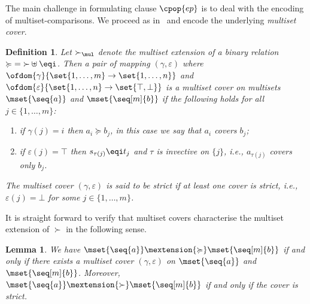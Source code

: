 \documentclass{LMCS}
\newtheorem{definition}[thm]{Definition}
\newtheorem{lemma}[thm]{Lemma}
\begin{document}
The main challenge in formulating clause $\cpop{ep}$
is to deal with the encoding of multiset-comparisons. 
We proceed as in~\cite{SK07} and encode the underlying \emph{multiset cover}.
\begin{definition}
Let $\succ_\mul$ denote the multiset extension of a binary relation ${\succcurlyeq} = {\succ} \uplus {\eqi}$.
Then a pair of mapping $(\gamma, \varepsilon)$ 
where $\ofdom{\gamma}{\set{1,\dots,m} \to \set{1,\dots,n}}$ 
and $\ofdom{\varepsilon}{\set{1,\dots,n} \to \set{\top,\bot}}$
is a multiset cover on multisets $\mset{\seq{a}}$ and $\mset{\seq[m]{b}}$
if the following holds for all $j \in \{1,\dots,m\}$:
\begin{enumerate}[labelsep=*,leftmargin=*]\label{d:mscover}
\item\label{d:mscover:1} if $\gamma(j) = i$ then $a_i \succcurlyeq b_j$, in this case we say that $a_i$ \emph{covers} $b_j$; 
\item\label{d:mscover:2} if $\varepsilon(j) = \top$ then $s_{\tau(j)} \eqi t_j$ and $\tau$ is invective on $\{j\}$, 
  i.e., $a_{\tau(j)}$ covers only $b_j$.
\end{enumerate}
The multiset cover $(\gamma, \varepsilon)$ is said to be \emph{strict} if at least one cover is strict, 
i.e., $\varepsilon(j) = \bot$ for some $j \in \{1,\dots,m\}$.
\end{definition}

It is straight forward to verify that multiset covers characterise the multiset extension
of $\succ$ in the following sense.
\begin{lemma}
  We have $\mset{\seq{a}} \mextension{\succcurlyeq} \mset{\seq[m]{b}}$ if and only if there 
  exists a multiset cover $(\gamma, \varepsilon)$ on $\mset{\seq{a}}$ and $\mset{\seq[m]{b}}$.
  Moreover, $\mset{\seq{a}} \mextension{\succ} \mset{\seq[m]{b}}$ if and only if the cover is strict.
\end{lemma}
\end{document}
